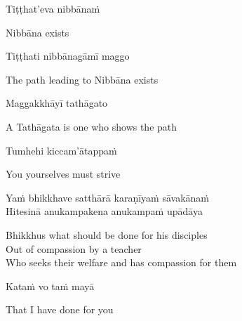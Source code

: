 \suttaRef{[Dhp 212]}

\begin{verses}
  Tiṭṭhat'eva nibbānaṁ
\end{verses}

\begin{english}
  Nibbāna exists
\end{english}

\begin{verses}
  Tiṭṭhati nibbānagāmī maggo
\end{verses}

\begin{english}
  The path leading to Nibbāna exists
\end{english}

\begin{verses}
  Maggakkhāyī tathāgato
\end{verses}

\begin{english}
  A Tathāgata is one who shows the path
\end{english}

\suttaRef{[MN 107]}

\begin{verses}
  Tumhehi kiccam'ātappaṁ
\end{verses}

\begin{english}
  You yourselves must strive
\end{english}

\suttaRef{[Dhp 276]}

\begin{verses}
  Yaṁ bhikkhave satthārā karaṇīyaṁ sāvakānaṁ\\
  Hitesinā anukampakena anukampaṁ upādāya
\end{verses}

\begin{english-verses}
  Bhikkhus what should be done for his disciples\\
  Out of compassion by a teacher\\
  Who seeks their welfare and has compassion for them
\end{english-verses}

\begin{verses}
  Kataṁ vo taṁ mayā
\end{verses}

\begin{english}
  That I have done for you
\end{english}

